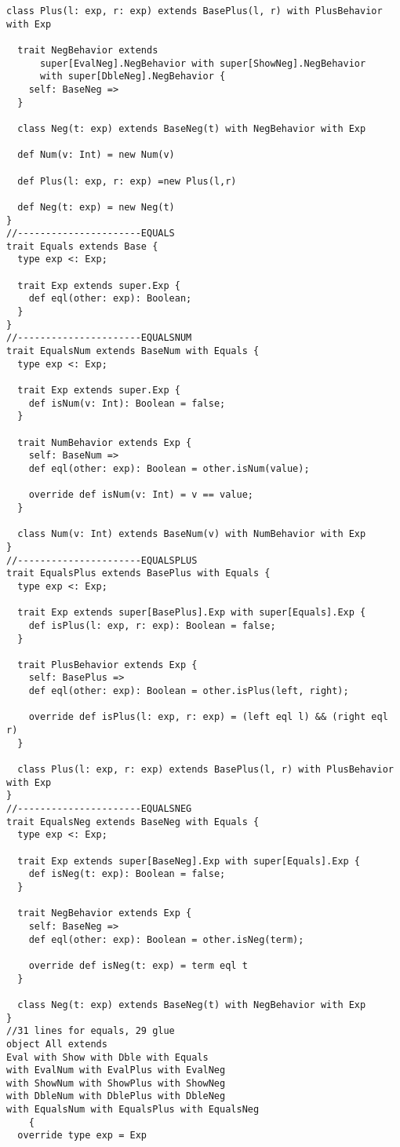 \begin{lstlisting}[basicstyle=\tiny]
   class Plus(l: exp, r: exp) extends BasePlus(l, r) with PlusBehavior with Exp

  trait NegBehavior extends
      super[EvalNeg].NegBehavior with super[ShowNeg].NegBehavior
      with super[DbleNeg].NegBehavior {
    self: BaseNeg =>
  }

  class Neg(t: exp) extends BaseNeg(t) with NegBehavior with Exp
  
  def Num(v: Int) = new Num(v)
  
  def Plus(l: exp, r: exp) =new Plus(l,r)

  def Neg(t: exp) = new Neg(t)
}
//----------------------EQUALS
trait Equals extends Base {
  type exp <: Exp;

  trait Exp extends super.Exp {
    def eql(other: exp): Boolean;
  }
}
//----------------------EQUALSNUM
trait EqualsNum extends BaseNum with Equals {
  type exp <: Exp;

  trait Exp extends super.Exp {
    def isNum(v: Int): Boolean = false;
  }

  trait NumBehavior extends Exp {
    self: BaseNum =>
    def eql(other: exp): Boolean = other.isNum(value);

    override def isNum(v: Int) = v == value;
  }

  class Num(v: Int) extends BaseNum(v) with NumBehavior with Exp
}
//----------------------EQUALSPLUS
trait EqualsPlus extends BasePlus with Equals {
  type exp <: Exp;

  trait Exp extends super[BasePlus].Exp with super[Equals].Exp {
    def isPlus(l: exp, r: exp): Boolean = false;
  }

  trait PlusBehavior extends Exp {
    self: BasePlus =>
    def eql(other: exp): Boolean = other.isPlus(left, right);

    override def isPlus(l: exp, r: exp) = (left eql l) && (right eql r)
  }

  class Plus(l: exp, r: exp) extends BasePlus(l, r) with PlusBehavior with Exp
}
//----------------------EQUALSNEG
trait EqualsNeg extends BaseNeg with Equals {
  type exp <: Exp;

  trait Exp extends super[BaseNeg].Exp with super[Equals].Exp {
    def isNeg(t: exp): Boolean = false;
  }

  trait NegBehavior extends Exp {
    self: BaseNeg =>
    def eql(other: exp): Boolean = other.isNeg(term);

    override def isNeg(t: exp) = term eql t
  }

  class Neg(t: exp) extends BaseNeg(t) with NegBehavior with Exp
}
//31 lines for equals, 29 glue
object All extends 
Eval with Show with Dble with Equals 
with EvalNum with EvalPlus with EvalNeg 
with ShowNum with ShowPlus with ShowNeg 
with DbleNum with DblePlus with DbleNeg 
with EqualsNum with EqualsPlus with EqualsNeg 
    {
  override type exp = Exp
  

\end{lstlisting}
